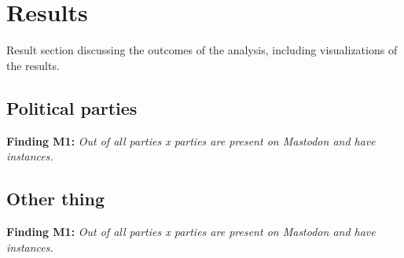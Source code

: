 \section{Results}

Result section discussing the outcomes of the analysis, including visualizations of the results.

\subsection{Political parties}

\textbf{Finding M1:} \textit{Out of all parties x parties are present on Mastodon and have instances.}

\subsection{Other thing}

\textbf{Finding M1:} \textit{Out of all parties x parties are present on Mastodon and have instances.}